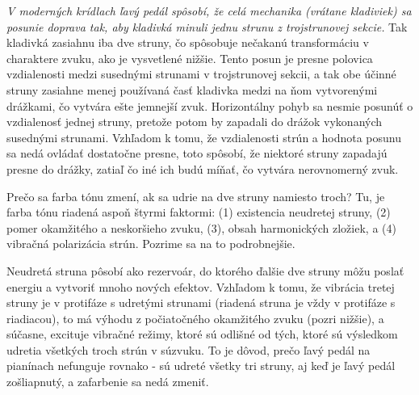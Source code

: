 \emph{V moderných krídlach ľavý pedál spôsobí, že celá mechanika (vrátane kladiviek) sa posunie doprava tak, aby kladivká minuli jednu strunu z trojstrunovej sekcie.} Tak kladivká zasiahnu iba dve struny, čo spôsobuje nečakanú transformáciu v charaktere zvuku, ako je vysvetlené nižšie. Tento posun je presne polovica vzdialenosti medzi susednými strunami v trojstrunovej sekcii, a tak obe účinné struny zasiahne menej používaná časť kladivka medzi na ňom vytvorenými drážkami, čo vytvára ešte jemnejší zvuk. Horizontálny pohyb sa nesmie posunúť o vzdialenosť jednej struny, pretože potom by zapadali do drážok vykonaných susednými strunami. Vzhľadom k tomu, že vzdialenosti strún a hodnota posunu sa nedá ovládať dostatočne presne, toto spôsobí, že niektoré struny zapadajú presne do drážky, zatiaľ čo iné ich budú míňať, čo vytvára nerovnomerný zvuk.

Prečo sa farba tónu zmení, ak sa udrie na dve struny namiesto troch? Tu, je farba tónu riadená aspoň štyrmi faktormi: (1) existencia neudretej struny, (2) pomer okamžitého a neskoršieho zvuku, (3), obsah harmonických zložiek, a (4) vibračná polarizácia strún. Pozrime sa na to podrobnejšie.

Neudretá struna pôsobí ako rezervoár, do ktorého ďalšie dve struny môžu poslať energiu a vytvoriť mnoho nových efektov. Vzhľadom k tomu, že vibrácia tretej struny je v protifáze s udretými strunami (riadená struna je vždy v protifáze s riadiacou), to má výhodu z počiatočného okamžitého zvuku (pozri nižšie), a súčasne, excituje vibračné režimy, ktoré sú odlišné od tých, ktoré sú výsledkom udretia všetkých troch strún v súzvuku. To je dôvod, prečo ľavý pedál na pianínach nefunguje rovnako - sú udreté všetky tri struny, aj keď je ľavý pedál zošliapnutý, a zafarbenie sa nedá zmeniť.

